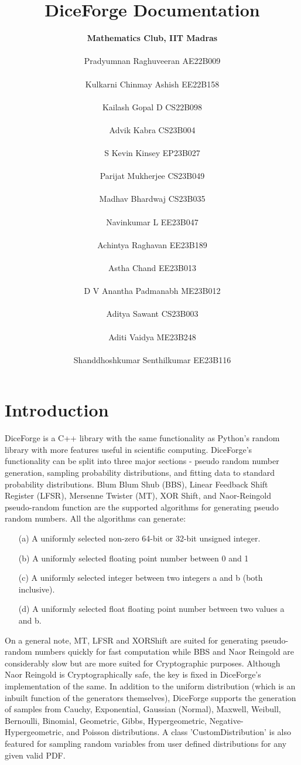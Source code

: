\documentclass[titlepage, 11pt]{article}
\title{\textbf{DiceForge Documentation}}
\author{\textbf{Mathematics Club, IIT Madras}\\\\
Pradyumnan Raghuveeran AE22B009\\\\
Kulkarni Chinmay Ashish EE22B158\\\\
Kailash Gopal D CS22B098\\\\
Advik Kabra CS23B004\\\\
S Kevin Kinsey EP23B027\\\\
Parijat Mukherjee CS23B049\\\\
Madhav Bhardwaj CS23B035\\\\
Navinkumar L EE23B047\\\\
Achintya Raghavan EE23B189\\\\
Astha Chand EE23B013\\\\
D V Anantha Padmanabh ME23B012\\\\
Aditya Sawant CS23B003\\\\
Aditi Vaidya ME23B248\\\\
Shanddhoshkumar Senthilkumar EE23B116}
\date{}
\begin{document}
\maketitle
\newpage

\setcounter{page}{0}
\tableofcontents
\listoffigures
\listoftables
\newpage

\section{Introduction}
DiceForge is a C++ library with the same functionality as Python's random library with more features useful in scientific computing. 
\newline
\newline
DiceForge's functionality can be split into three major sections - pseudo random number generation, sampling probability distributions, and fitting data to standard probability distributions.
\newline
\newline
Blum Blum Shub (BBS), Linear Feedback Shift Register (LFSR), Mersenne Twister (MT), XOR Shift, and Naor-Reingold pseudo-random function are the supported algorithms for generating pseudo random numbers.
All the algorithms can generate:
\begin{itemize}
    \item [(a)] A uniformly selected non-zero 64-bit or 32-bit unsigned integer.
    \item [(b)] A uniformly selected floating point number between 0 and 1
    \item [(c)] A uniformly selected integer between two integers a and b (both inclusive).
    \item [(d)] A uniformly selected float floating point number between two values a and b.
\end{itemize}
On a general note, MT, LFSR and XORShift are suited for generating pseudo-random numbers quickly for fast computation while BBS and Naor Reingold are considerably slow but are more suited for Cryptographic purposes. Although Naor Reingold is Cryptographically safe, the key is fixed in DiceForge's implementation of the same.
\newline
\newline
In addition to the uniform distribution (which is an inbuilt function of the generators themselves), DiceForge supports the generation of samples from Cauchy, Exponential, Gaussian (Normal), Maxwell, Weibull, Bernoulli, Binomial, Geometric, Gibbs, Hypergeometric, Negative-Hypergeometric, and Poisson distributions. A class 'CustomDistribution' is also featured for sampling random variables from user defined distributions for any given valid PDF.
\end{document}
